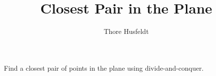 \documentclass{tufte-handout}
\title{Closest Pair in the Plane}
\author{Thore Husfeldt}
\begin{document}
\maketitle

\subsection{}
Find a closest pair of points in the plane using divide-and-conquer.
\end{document}
